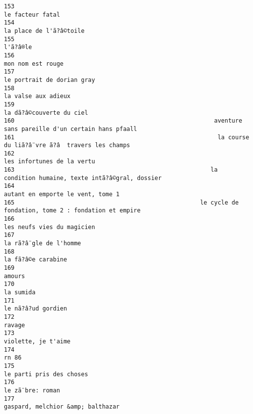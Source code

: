 \documentclass[
]{report}
\begin{document}
\begin{verbatim}
153                                                                                        le facteur fatal
154                                                                                 la place de l'ã?â©toile
155                                                                                                l'ã?â®le
156                                                                                       mon nom est rouge
157                                                                              le portrait de dorian gray
158                                                                                     la valse aux adieux
159                                                                                la dã?â©couverte du ciel
160                                                         aventure sans pareille d'un certain hans pfaall
161                                                          la course du liã?â¨vre ã?â  travers les champs
162                                                                              les infortunes de la vertu
163                                                        la condition humaine, texte intã?â©gral, dossier
164                                                                       autant en emporte le vent, tome 1
165                                                     le cycle de fondation, tome 2 : fondation et empire
166                                                                              les neufs vies du magicien
167                                                                                  la rã?â¨gle de l'homme
168                                                                                      la fã?â©e carabine
169                                                                                                  amours
170                                                                                               la sumida
171                                                                                      le nã?â?ud gordien
172                                                                                                  ravage
173                                                                                     violette, je t'aime
174                                                                                                   rn 86
175                                                                                le parti pris des choses
176                                                                                        le zã¨bre: roman
177                                                                       gaspard, melchior &amp; balthazar

\end{verbatim}
\end{document}
